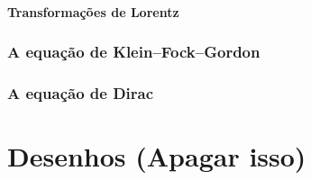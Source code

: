 \documentclass{header}
\begin{document}
            \subsection{Transformações de Lorentz}
                

        \section{A equação de Klein--Fock--Gordon}
            

        \section{A equação de Dirac}
            




\part{Desenhos (Apagar isso)}




\nocite{*}
\end{document}
